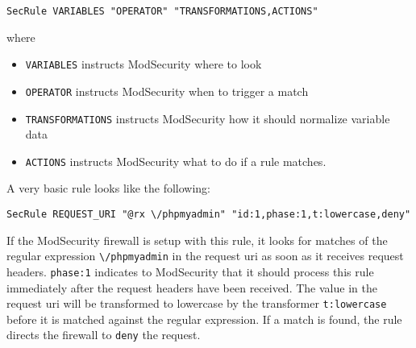 \begin{lstlisting}[style=basicStyle]
SecRule VARIABLES "OPERATOR" "TRANSFORMATIONS,ACTIONS"
\end{lstlisting}


where

\begin{itemize}
	\item \verb|VARIABLES| instructs ModSecurity where to look
	\item \verb|OPERATOR| instructs ModSecurity when to trigger a match
	\item \verb|TRANSFORMATIONS| instructs ModSecurity how it should normalize variable data
	\item \verb|ACTIONS| instructs ModSecurity what to do if a rule matches. 
\end{itemize}


A very basic rule looks like the following:

\begin{lstlisting}[style=basicStyle]
SecRule REQUEST_URI "@rx \/phpmyadmin" "id:1,phase:1,t:lowercase,deny"
\end{lstlisting}

If the ModSecurity firewall is setup with this rule, it looks for matches of the regular expression \verb|\/phpmyadmin| in the request uri as soon as it receives request headers. \verb|phase:1| indicates to ModSecurity that it should process this rule immediately after the request headers have been received.
The value in the request uri will be transformed to lowercase by the transformer \verb|t:lowercase| before it is matched against the regular expression. 
If a match is found, the rule directs the firewall to \verb|deny| the request. \cite{modsec/secRule, crs/creating}


